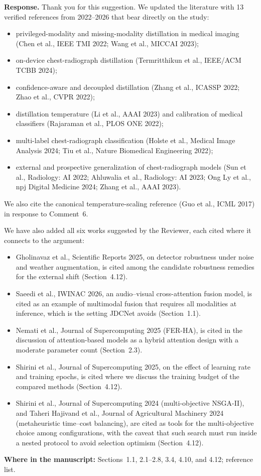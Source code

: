 \documentclass[11pt]{article}
\newcommand{\where}[1]{\par\noindent\textbf{Where in the manuscript:} #1\par}
\begin{document}
\textbf{Response.} Thank you for this suggestion. We updated the literature
with 13 verified references from 2022--2026 that bear directly on the study:
\begin{itemize}[leftmargin=1.4em]
  \item privileged-modality and missing-modality distillation in medical imaging (Chen et al., IEEE TMI 2022; Wang et al., MICCAI 2023);
  \item on-device chest-radiograph distillation (Termritthikun et al., IEEE/ACM TCBB 2024);
  \item confidence-aware and decoupled distillation (Zhang et al., ICASSP 2022; Zhao et al., CVPR 2022);
  \item distillation temperature (Li et al., AAAI 2023) and calibration of medical classifiers (Rajaraman et al., PLOS ONE 2022);
  \item multi-label chest-radiograph classification (Holste et al., Medical Image Analysis 2024; Tiu et al., Nature Biomedical Engineering 2022);
  \item external and prospective generalization of chest-radiograph models (Sun et al., Radiology: AI 2022; Ahluwalia et al., Radiology: AI 2023; Ong Ly et al., npj Digital Medicine 2024; Zhang et al., AAAI 2023).
\end{itemize}
We also cite the canonical temperature-scaling reference (Guo et al., ICML
2017) in response to Comment~6.

We have also added all six works suggested by the Reviewer, each cited where it
connects to the argument:
\begin{itemize}[leftmargin=1.4em]
  \item Gholinavaz et al., Scientific Reports 2025, on detector robustness under noise and weather augmentation, is cited among the candidate robustness remedies for the external shift (Section~4.12).
  \item Saeedi et al., IWINAC 2026, an audio--visual cross-attention fusion model, is cited as an example of multimodal fusion that requires all modalities at inference, which is the setting JDCNet avoids (Section~1.1).
  \item Nemati et al., Journal of Supercomputing 2025 (FER-HA), is cited in the discussion of attention-based models as a hybrid attention design with a moderate parameter count (Section~2.3).
  \item Shirini et al., Journal of Supercomputing 2025, on the effect of learning rate and training epochs, is cited where we discuss the training budget of the compared methods (Section~4.12).
  \item Shirini et al., Journal of Supercomputing 2024 (multi-objective NSGA-II), and Taheri Hajivand et al., Journal of Agricultural Machinery 2024 (metaheuristic time--cost balancing), are cited as tools for the multi-objective choice among configurations, with the caveat that such search must run inside a nested protocol to avoid selection optimism (Section~4.12).
\end{itemize}
\where{Sections~1.1, 2.1--2.8, 3.4, 4.10, and 4.12; reference list.}
\end{document}
